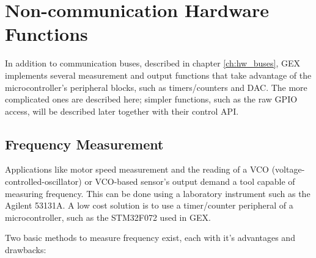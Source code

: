 \chapter{Non-communication Hardware Functions}

In addition to communication buses, described in chapter \ref{ch:hw_buses}, GEX implements several measurement and output functions that take advantage of the microcontroller's peripheral blocks, such as timers/counters and DAC. The more complicated ones are described here; simpler functions, such as the raw GPIO access, will be described later together with their control API.

\section{Frequency Measurement} \label{sec:theory-fcap}

Applications like motor speed measurement and the reading of a VCO (voltage-controlled-oscillator) or VCO-based sensor's output demand a tool capable of measuring frequency. This can be done using a laboratory instrument such as the Agilent 53131A. A low cost solution is to use a timer/counter peripheral of a microcontroller, such as the STM32F072 used in GEX.

Two basic methods to measure frequency exist, each with it's advantages and drawbacks:

